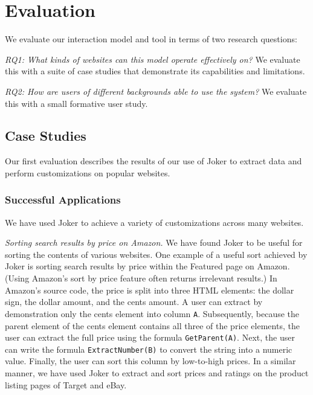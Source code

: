 \documentclass[sigconf,10pt]{acmart}
\begin{document}
\hypertarget{sec:evaluation}{%
\section{Evaluation}\label{sec:evaluation}}

We evaluate our interaction model and tool in terms of two research
questions:

\emph{RQ1: What kinds of websites can this model operate effectively
on?} We evaluate this with a suite of case studies that demonstrate its
capabilities and limitations.

\emph{RQ2: How are users of different backgrounds able to use the
system?} We evaluate this with a small formative user study.

\hypertarget{case-studies}{%
\subsection{Case Studies}\label{case-studies}}

Our first evaluation describes the results of our use of Joker to
extract data and perform customizations on popular websites.

\hypertarget{successful-applications}{%
\subsubsection{Successful Applications}\label{successful-applications}}

We have used Joker to achieve a variety of customizations across many
websites.

\emph{Sorting search results by price on Amazon.} We have found Joker to
be useful for sorting the contents of various websites. One example of a
useful sort achieved by Joker is sorting search results by price within
the Featured page on Amazon. (Using Amazon's sort by price feature often
returns irrelevant results.) In Amazon's source code, the price is split
into three HTML elements: the dollar sign, the dollar amount, and the
cents amount. A user can extract by demonstration only the cents element
into column \texttt{A}. Subsequently, because the parent element of the
cents element contains all three of the price elements, the user can
extract the full price using the formula \texttt{GetParent(A)}. Next,
the user can write the formula \texttt{ExtractNumber(B)} to convert the
string into a numeric value. Finally, the user can sort this column by
low-to-high prices. In a similar manner, we have used Joker to extract
and sort prices and ratings on the product listing pages of Target and
eBay.
\end{document}
